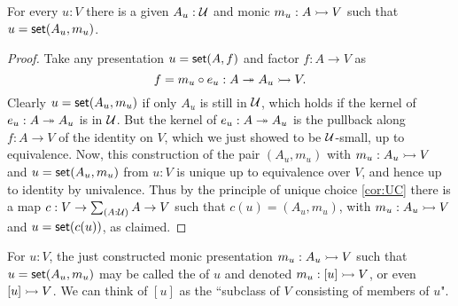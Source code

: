 \begin{lem}\label{lem:MonicSetPresent}
For every $u:V$ there is a given $A_u:\mathcal{U}$ and monic $m_u: A \rightarrowtail V$ such that $u = \mathsf{set}(A_u, m_u)$.
\end{lem}

\begin{proof}
Take any presentation $u = \mathsf{set}(A,f)$ and factor $f:A\to V$ as $$f = m_u\circ e_u : A \twoheadrightarrow A_u \rightarrowtail V.$$  Clearly $u = \mathsf{set}(A_u, m_u)$ if only $A_u$ is still in $\mathcal{U}$, which holds if the kernel of $e_u : A \twoheadrightarrow A_u$ is in $\mathcal{U}$.  But the kernel of $e_u : A \twoheadrightarrow A_u$ is the pullback along $f : A\to V$ of the identity on $V$, which we just showed to be $\mathcal{U}$-small, up to equivalence.  Now, this construction of the pair $(A_u, m_u)$ with $m_u :A_u \rightarrowtail V$ and $u = \mathsf{set}(A_u, m_u)$ from $u:V$ is unique up to equivalence over $V$, and hence up to identity by univalence.  Thus by the principle of unique choice \eqref{cor:UC} there is a map $c : V\to\sm{A:\UU}A\to V$ such that $c(u) = (A_u, m_u)$, with $m_u :A_u \rightarrowtail V$ and $u = \mathsf{set}(c(u))$, as claimed.
\end{proof}

\begin{defn}\label{def:TypeOfElements}
For $u:V$, the just constructed monic presentation $m_u: A_u \rightarrowtail V$ such that $u = \mathsf{set}(A_u, m_u)$ may be called the  of $u$ and denoted $m_u : [u] \rightarrowtail V$, or even $[u] \rightarrowtail V$.  We can think of $[u]$ as the ``subclass of $V$ consisting of members of $u$".
\end{defn}

